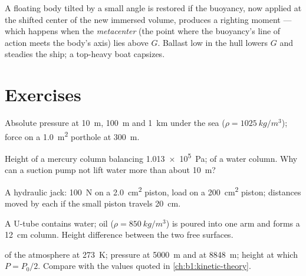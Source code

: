 \begin{remark}[Stability]\label{rem:b1:fluid-statics:stability}
A floating body tilted by a small angle is restored if the buoyancy,
now applied at the shifted center of the new immersed volume, produces
a righting moment --- which happens when the \emph{metacenter} (the point
where the buoyancy's line of action meets the body's axis) lies above
$G$. Ballast low in the hull lowers $G$ and steadies the ship; a
top-heavy boat capsizes.
\end{remark}

\section{Exercises}

\begin{exercise}[$\star$]\label{exo:b1:fluid-statics:1}
Absolute pressure at \qty{10}{m}, \qty{100}{m} and \qty{1}{km} under the
sea ($\rho = \qty{1025}{kg/m^3}$); force on a \qty{1.0}{m^2} porthole at
\qty{300}{m}.
\end{exercise}

\begin{exercise}[$\star$]\label{exo:b1:fluid-statics:2}
Height of a mercury column balancing \qty{1.013e5}{Pa}; of a water column.
Why can a suction pump not lift water more than about \qty{10}{m}?
\end{exercise}

\begin{exercise}[$\star$]\label{exo:b1:fluid-statics:3}
A hydraulic jack: \qty{100}{N} on a \qty{2.0}{cm^2} piston, load on a
\qty{200}{cm^2} piston; distances moved by each if the small piston
travels \qty{20}{cm}.
\end{exercise}

\begin{exercise}[$\star$]\label{exo:b1:fluid-statics:4}
A U-tube contains water; oil ($\rho = \qty{850}{kg/m^3}$) is poured into
one arm and forms a \qty{12}{cm} column. Height difference between the
two free surfaces.
\end{exercise}

\begin{exercise}[$\star\star$]\label{exo:b1:fluid-statics:5}
 of the atmosphere at \qty{273}{K}; pressure at \qty{5000}{m}
and at \qty{8848}{m}; height at which $P = P_0/2$. Compare with the
values quoted in \cref{ch:b1:kinetic-theory}.
\end{exercise}

